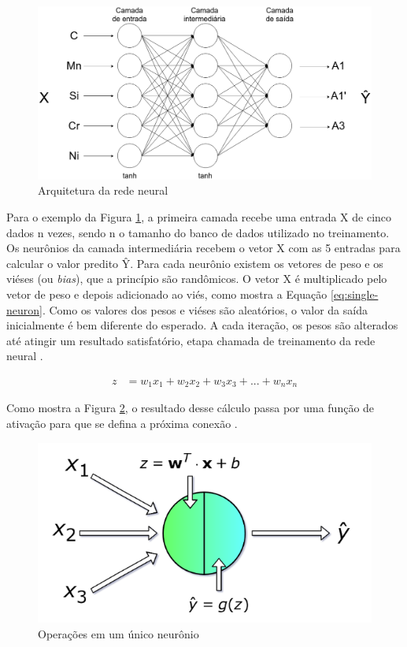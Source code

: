 \documentclass[brazil,tf,epusp]{usp}  %
\begin{document}
\begin{figure}[ht!]
  \includegraphics[width=.9\textwidth]{img/neural-network.png}
  \caption{Arquitetura da rede neural}
  \label{fig:rede-neural-arquitetura}
\end{figure}

Para o exemplo da Figura \ref{fig:rede-neural-arquitetura}, a primeira camada recebe uma entrada X de cinco dados n vezes, sendo n o tamanho do banco de dados utilizado no treinamento. Os neurônios da camada intermediária recebem o vetor X com as 5 entradas para calcular o valor predito Ŷ. Para cada neurônio existem os vetores de peso e os viéses (ou \textit{bias}), que a princípio são randômicos. O vetor X é multiplicado pelo vetor de peso e depois adicionado ao viés, como mostra a Equação \ref{eq:single-neuron}. Como os valores dos pesos e viéses são aleatórios, o valor da saída inicialmente é bem diferente do esperado. A cada iteração, os pesos são alterados até atingir um resultado satisfatório, etapa chamada de treinamento da rede neural \cite{Bhadeshia1999}.

\begin{align}
  z &= {w}_1 {x}_1 + {w}_2 {x}_2 + {w}_3 {x}_3 + ... + {w}_n {x}_n \label{eq:single-neuron}
\end{align}

Como mostra a Figura \ref{fig:single-neuron}, o resultado desse cálculo passa por uma função de ativação para que se defina a próxima conexão \cite{Skalski2017}.

\begin{figure}[ht!]
  \includegraphics[width=.7\textwidth]{img/single-neuron.png}
  \caption{Operações em um único neurônio \cite{Skalski2017}}
  \label{fig:single-neuron}
\end{figure}
\end{document}
